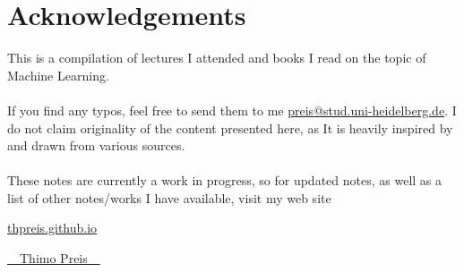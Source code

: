 
\newpage
\section*{Acknowledgements}

This is a compilation of lectures I attended and books I read on the topic of Machine Learning.\\
\\
If you find any typos, feel free to send them to me \href{mailto:preis@stud.uni-heidelberg.de}{preis@stud.uni-heidelberg.de}. I do not claim originality of the content presented here, as It is heavily inspired by and drawn from various sources.
\\
\\
These notes are currently a work in progress, so for updated notes, as well as a list of other notes/works I have available, visit my web site

\begin{center}
    \href{thpreis.github.io}{thpreis.github.io}
\end{center}
\vspace{1cm}

\begin{flushright}
    \Huge{{\cursive\setul{0.1ex}{}\ul{~~Thimo Preis~~}}}
\end{flushright}
